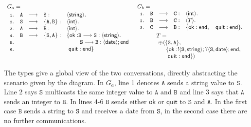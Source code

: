 \documentclass{article}
\newcommand{\kf}[1]{\textup{\textsf{#1}}\xspace}
\newcommand{\participant}[1]{\ensuremath{\mathtt{#1}}}
\newcommand{\redsym}{\ensuremath{\longrightarrow}}
\newcommand{\End}{\kf{end}}
\begin{document}
{\small
$
\begin{array}{ll}
G_a =&  G_b =\\
\begin{array}{llllll}
 \nm{1}& \participant{A} & \redsym & \participant{S}: & \langle \kf{string}\rangle.\\
  \nm{2}&\participant{S}  & \redsym & \{\participant{A},\participant{B}\}: & \langle \mathsf{int}\rangle .\\
  \nm{3}&\participant{A} & \redsym & \participant{B}:& \langle \mathsf{int}\rangle .\\
  \nm{4}&\participant{B} & \redsym & \{\participant{S},\participant{A}\}: & \{\mathsf{ok:}
 \participant{B} \redsym \participant{S}:\langle \kf{string}\rangle.\\
 \nm{5}& & & & \quad\quad \ \participant{S} \redsym
\participant{B}:
\langle \kf{date}\rangle ;\End\\
\nm{6} & & & & \ \mathsf{quit}: \End\}\\
\\
\end{array}
&
\begin{array}{llllll}
 \nm{1} & \participant{B}& \redsym & \participant{C}:&\langle \kf{int}\rangle .\\
 \nm{2}      &\participant{B}& \redsym & \participant{C}:&\langle T \rangle .\\
 \nm{3}     &\participant{C}& \redsym & \participant{B}: &
\{\mathsf{ok}:
\End, \quad \mathsf{quit}: \End\}.\\[1mm]
 & & & & \hspace{-1.8cm}
T=\\
 & & & & \hspace{-1.8cm}\
\oplus \langle\{\participant{S},\participant{A}\},\\
 & & & & \hspace{-1.8cm} \  \ \ \ \ \{\mathsf{ok}:!\langle
\participant{S},\kf{string}\rangle; ?\langle
\participant{S},
\kf{date}\rangle;
\End,\\
 & & & & \hspace{-1.8cm} \ \ \ \ \ \ \mathsf{quit}: \End\}\rangle\\[0.5mm]
\end{array}
\end{array}
$\\[0.5mm]
}

The types give a global view of the two
conversations, directly abstracting the scenario given by the
diagram. In $G_a$, line 1 denotes $\participant{A}$ sends a
string value to $\participant{S}$. Line 2 says $\participant{S}$
multicasts the same integer value to $\participant{A}$ and
$\participant{B}$ and line 3 says that $\participant{A}$ sends an integer to
$\participant{B}$. In lines 4-6 $\participant{B}$ sends either
$\mathsf{ok}$ or $\mathsf{quit}$ to $\participant{S}$ and
$\participant{A}$. In the first case $\participant{B}$ sends a
string to $\participant{S}$ and receives a date from
$\participant{S}$, in the second case there are no further
communications.
\end{document}
